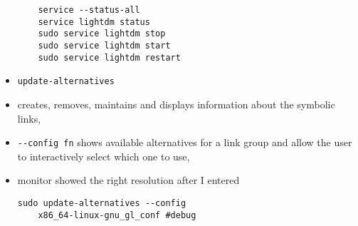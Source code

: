 \documentclass[twocolumn]{IEEEtran} %
\begin{document}
\begin{itemize}
    \ei
    \begin{verbatim}
    service --status-all
    service lightdm status
    sudo service lightdm stop
    sudo service lightdm start
    sudo service lightdm restart
    \end{verbatim}
    \item \verb|update-alternatives|
    \bi
        \item creates, removes, maintains and displays information about the symbolic links,
        \item  \verb|--config fn| shows available alternatives for a link group and allow the user to interactively select which one to use,
        \item monitor showed the right resolution after I entered
        \begin{verbatim}
sudo update-alternatives --config
    x86_64-linux-gnu_gl_conf #debug
        \end{verbatim}
    \ei
\end{itemize}

\newpage
\end{document}
